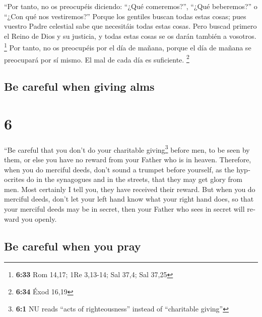 \begin{paracol}{2}
 ``Por tanto, no os preocupéis diciendo: ``¿Qué
comeremos?'', ``¿Qué beberemos?'' o ``¿Con qué nos vestiremos?''
 Porque los gentiles buscan todas estas cosas; pues
vuestro Padre celestial sabe que necesitáis todas estas cosas.
 Pero buscad primero el Reino de Dios y su justicia, y
todas estas cosas se os darán también a vosotros. \footnote{\textbf{6:33}
  Rom 14,17; 1Re 3,13-14; Sal 37,4; Sal 37,25}  Por
tanto, no os preocupéis por el día de mañana, porque el día de mañana se
preocupará por sí mismo. El mal de cada día es suficiente. \footnote{\textbf{6:34}
  Éxod 16,19}

\switchcolumn
\begin{otherlanguage}{english}

\hypertarget{be-careful-when-giving-alms}{%
\subsection{Be careful when giving
alms}\label{be-careful-when-giving-alms}}

\hypertarget{section-11}{%
\section{6}\label{section-11}}

 ``Be careful that you don't do your charitable
giving\footnote{\textbf{6:1} NU reads ``acts of righteousness'' instead
  of ``charitable giving''} before men, to be seen by them, or else you
have no reward from your Father who is in heaven. 
Therefore, when you do merciful deeds, don't sound a trumpet before
yourself, as the hypocrites do in the synagogues and in the streets,
that they may get glory from men. Most certainly I tell you, they have
received their reward.  But when you do merciful deeds,
don't let your left hand know what your right hand does, 
so that your merciful deeds may be in secret, then your Father who sees
in secret will reward you openly.

\hypertarget{be-careful-when-you-pray}{%
\subsection{Be careful when you pray}\label{be-careful-when-you-pray}}


\end{otherlanguage}
\end{paracol}
